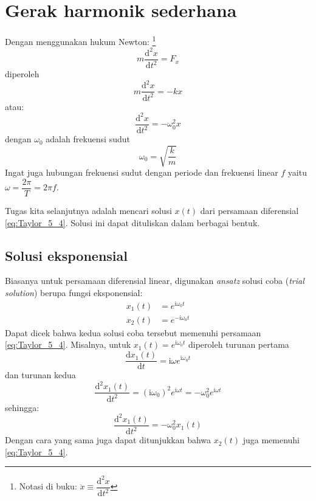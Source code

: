 \section{Gerak harmonik sederhana}

Dengan menggunakan hukum Newton:
\footnote{
Notasi di buku: $\ddot{x}\equiv\dfrac{\mathrm{d}^{2}x}{\mathrm{d}t^{2}}$
}
\begin{equation*}
m \frac{\mathrm{d}^2x}{\mathrm{d}t^2} = F_x
\end{equation*}
%
diperoleh
%
\begin{equation*}
m \frac{\mathrm{d}^2x}{\mathrm{d}t^2}  = -kx
\end{equation*}
%
atau:
%
\begin{equation}
\frac{\mathrm{d}^2x}{\mathrm{d}t^2} = -\omega_0^2 x
\label{eq:Taylor_5_4}
\end{equation}
%
dengan $\omega_0$ adalah frekuensi sudut
%
\begin{equation}
\omega_{0} = \sqrt{\frac{k}{m}}
\end{equation}
%
Ingat juga hubungan frekuensi sudut dengan periode dan frekuensi linear $f$
yaitu $\omega = \dfrac{2 \pi}{T} = 2 \pi f$.

Tugas kita selanjutnya adalah mencari solusi $x(t)$ dari persamaan diferensial
\eqref{eq:Taylor_5_4}. Solusi ini dapat dituliskan dalam berbagai bentuk.



\subsection*{Solusi eksponensial}

Biasanya untuk persamaan diferensial linear, digunakan \textit{ansatz} solusi
coba (\textit{trial solution}) berupa fungsi eksponensial:
\begin{align*}
x_{1}(t) & = e^{\mathrm{i}\omega_0 t} \\
x_{2}(t) & = e^{-\mathrm{i}\omega_0 t}
\end{align*}
%
Dapat dicek bahwa kedua solusi coba tersebut memenuhi persamaan \eqref{eq:Taylor_5_4}.
Misalnya, untuk $x_{1}(t) = e^{\mathrm{i}\omega_0 t}$ diperoleh turunan pertama
%
\begin{equation*}
\frac{\mathrm{d}x_{1}(t)}{\mathrm{d}t} = \mathrm{i}\omega e^{\mathrm{i} \omega_0 t}
\end{equation*}
%
dan turunan kedua
%
\begin{equation*}
\frac{\mathrm{d}^{2}x_{1}(t)}{\mathrm{d}t^{2}} = (\mathrm{i}\omega_0)^{2} e^{\mathrm{i} \omega t} =
-\omega_{0}^{2}e^{\mathrm{i} \omega t}
\end{equation*}
sehingga:
\begin{equation*}
\frac{\mathrm{d}^{2}x_1(t)}{\mathrm{d}t^{2}} = -\omega_0^{2} x_{1}(t)
\end{equation*}
Dengan cara yang sama juga dapat ditunjukkan bahwa $x_{2}(t)$ juga
memenuhi \eqref{eq:Taylor_5_4}.

